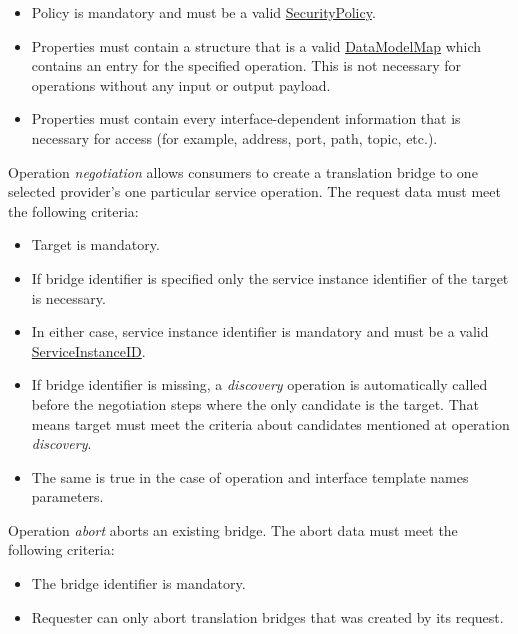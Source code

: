 \documentclass[a4paper]{arrowhead}
\newcommand{\pref}[1]{{\textcolor{ArrowheadGrey}{\hyperref[sec:model:primitives:#1]{#1}}}}
\begin{document}
\begin{itemize}
\begin{itemize}
\begin{itemize}
            \item Policy is mandatory and must be a valid \pref{SecurityPolicy}.
            \item Properties must contain a structure that is a valid \hyperref[sec:model:DataModelMap]{DataModelMap} which contains an entry for the specified operation. This is not necessary for operations without any input or output payload.
            \item Properties must contain every interface-dependent information that is necessary for access (for example, address, port, path, topic, etc.).
        \end{itemize}
    \end{itemize}
\end{itemize}


Operation \textit{negotiation} allows consumers to create a translation bridge to one selected provider's one particular service operation. The request data must meet the following criteria:

\begin{itemize}
    \item Target is mandatory.
    \item If bridge identifier is specified only the service instance identifier of the target is necessary.
    \item In either case, service instance identifier is mandatory and  must be a valid \pref{ServiceInstanceID}.
    \item If bridge identifier is missing, a \textit{discovery} operation is automatically called before the negotiation steps where the only candidate is the target. That means target must meet the criteria about candidates mentioned at operation \textit{discovery}. 
    \item The same is true in the case of operation and interface template names parameters.
\end{itemize}


Operation \textit{abort} aborts an existing bridge. The abort data must meet the following criteria:

\begin{itemize}
    \item The bridge identifier is mandatory.
    \item Requester can only abort translation bridges that was created by its request.
\end{itemize}
\end{document}
